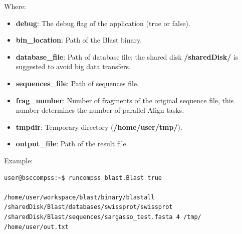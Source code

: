 Where:

\begin{itemize}
 \item {\bf debug}: The debug flag of the application (true or false).
 \item {\bf bin\_location}: Path of the Blast binary.
 \item {\bf database\_file}: Path of database file; the shared disk {\bf /sharedDisk/} is suggested to avoid big data transfers.
 \item {\bf sequences\_file}: Path of sequences file.
 \item {\bf frag\_number}: Number of fragments of the original sequence file, this number determines the number of parallel Align tasks.
 \item {\bf tmpdir}: Temporary directory ({\bf /home/user/tmp/}).
 \item {\bf output\_file}: Path of the result file.
\end{itemize}
 
Example:

\begin{lstlisting}[language=bash]
user@bsccompss:~$ runcompss blast.Blast true

/home/user/workspace/blast/binary/blastall
/sharedDisk/Blast/databases/swissprot/swissprot
/sharedDisk/Blast/sequences/sargasso_test.fasta 4 /tmp/
/home/user/out.txt
\end{lstlisting}
